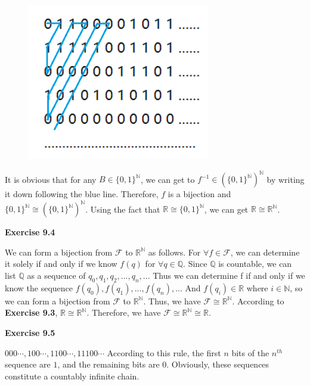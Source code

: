 \documentclass{article} %
\begin{document}
\begin{figure}[H]
    \centering
    \includegraphics[width=8cm]{9_3_1.png}
    \caption{}
    \label{}
    \end{figure}
It is obvious that for any $B\in \{0,1\}^\mathbb{N}$, we can get to $f^{-1}\in (\{0,1\}^\mathbb{N})^\mathbb{N}$ by writing it down following the blue line. Therefore, $f$ is a bijection and $\{0,1\}^\mathbb{N}\cong (\{0,1\}^\mathbb{N})^\mathbb{N}$. Using the fact that $\mathbb{R}\cong \{0,1\}^\mathbb{N}$, we can get $\mathbb{R}\cong \mathbb{R}^\mathbb{N}$.\par


	\textbf{Exercise 9.4}\par
	We can form a bijection from $\mathcal{F}$ to $\mathbb{R}^\mathbb{N}$ as follows. For $\forall f\in \mathcal{F}$, we can determine it solely if and only if we know $f(q)$ for $\forall q\in \mathbb{Q}$. Since $\mathbb{Q}$ is countable, we can list $\mathbb{Q}$ as a sequence of $q_{0},q_{1},q_{2},...,q_{n},...$ Thus we can determine f if and only if we know the sequence $f(q_{0}),f(q_{1}),...,f(q_{n}),...$ And $f(q_{i})\in \mathbb{R}$ where $i\in \mathbb{N}$, so we can form a bijection from  $\mathcal{F}$ to $\mathbb{R}^\mathbb{N}$.
	Thus, we have   $\mathcal{F} \cong \mathbb{R}^{\mathbb{N}}$. According to \textbf{Exercise 9.3},  $\mathbb{R} \cong \mathbb{R}^{\mathbb{N}}$.
	Therefore, we have $\mathcal{F} \cong \mathbb{R}^{\mathbb{N}} \cong \mathbb{R}$.\par

	\textbf{Exercise 9.5}\par
    $000\cdots,100\cdots,1100\cdots,11100\cdots$ According to this rule, the first $n$ bits of the $n^{th}$ sequence are $1$, and the remaining bits are $0$. Obviously, these sequences constitute a countably infinite chain.\par
	
\end{document}
